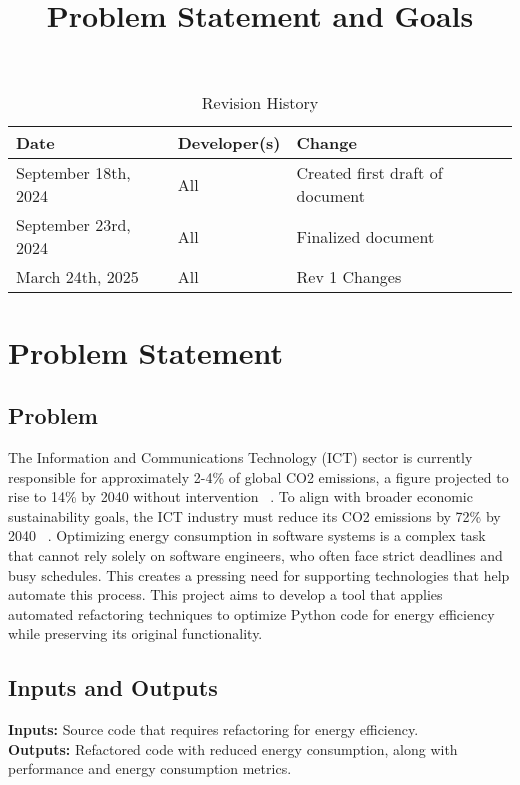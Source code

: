 \documentclass{article}
\title{Problem Statement and Goals\\\progname}
\author{\authname}
\date{}
\begin{document}
\maketitle

\begin{table}[hp]
  \caption{Revision History} \label{TblRevisionHistory}
  \begin{tabularx}{\textwidth}{llX}
    \toprule
    \textbf{Date} & \textbf{Developer(s)} & \textbf{Change}\\
    \midrule
    September 18th, 2024 & All & Created first draft of document\\
    September 23rd, 2024 & All & Finalized document\\
    March 24th, 2025 & All & Rev 1 Changes \\
    \bottomrule
  \end{tabularx}
\end{table}

\newpage

\section{Problem Statement}

\subsection{Problem}

The Information and Communications Technology (ICT) sector is currently 
responsible for approximately 2-4\% of global CO2 emissions, a figure 
projected to rise to 14\% by 2040 without intervention ~\citep{BelkhirAndElmeligi2018}. 
To align with broader economic sustainability goals, 
the ICT industry must reduce its CO2 emissions by 72\% by 
2040 ~\citep{FreitagAndBernersLee2021}. Optimizing energy 
consumption in software systems is a complex task that cannot 
rely solely on software engineers, who often face strict deadlines 
and busy schedules. This creates a pressing need for supporting 
technologies that help automate this process. This project aims 
to develop a tool that applies automated refactoring techniques 
to optimize Python code for energy efficiency while preserving its 
original functionality. 

\subsection{Inputs and Outputs}

\textbf{Inputs:} Source code that requires refactoring for energy efficiency. \\
\textbf{Outputs:} Refactored code with reduced energy consumption, along with performance and energy consumption metrics.
\end{document}
